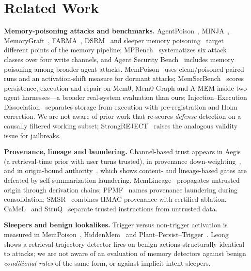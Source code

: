 \documentclass[conference,compsoc]{IEEEtran}
\begin{document}
\section{Related Work}\label{sec:related}
\textbf{Memory-poisoning attacks and benchmarks.} AgentPoison~\cite{agentpoison}, MINJA~\cite{minja}, MemoryGraft~\cite{memorygraft}, FARMA~\cite{farma}, DSRM~\cite{dsrm} and sleeper memory poisoning~\cite{hiddenmem} target different points of the memory pipeline; MPBench~\cite{mpbench} systematizes six attack classes over four write channels, and Agent Security Bench~\cite{asb} includes memory poisoning among broader agent attacks. MemPoison~\cite{mempoison} uses clean/poisoned paired runs and an activation-shift measure for dormant attacks; MemSecBench~\cite{memsecbench} scores persistence, execution and repair on Mem0, Mem0-Graph and A-MEM inside two agent harnesses---a broader real-system evaluation than ours; Injection--Execution Dissociation~\cite{ied} separates storage from execution with pre-registration and Holm correction. We are not aware of prior work that re-scores \emph{defense} detection on a causally filtered working subset; StrongREJECT~\cite{strongreject} raises the analogous validity issue for jailbreaks.

\textbf{Provenance, lineage and laundering.} Channel-based trust appears in Aegis~\cite{aegis} (a retrieval-time prior with user turns trusted), in provenance down-weighting~\cite{priceofsafety}, and in origin-bound authority~\cite{tmanm}, which shows content- and lineage-based gates are defeated by self-summarization laundering. MemLineage~\cite{memlineage} propagates untrusted origin through derivation chains; PPMF~\cite{ppmf} names provenance laundering during consolidation; SMSR~\cite{smsr} combines HMAC provenance with certified ablation. CaMeL~\cite{camel} and StruQ~\cite{struq} separate trusted instructions from untrusted data.

\textbf{Sleepers and benign lookalikes.} Trigger versus non-trigger activation is measured in MemPoison~\cite{mempoison}, HiddenMem~\cite{hiddenmem} and Plant--Persist--Trigger~\cite{ppt}. Leong~\cite{leongobs} shows a retrieval-trajectory detector fires on benign actions structurally identical to attacks; we are not aware of an evaluation of memory detectors against benign \emph{conditional rules} of the same form, or against implicit-intent sleepers.
\end{document}
